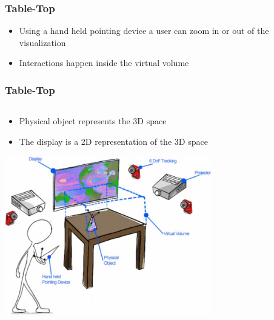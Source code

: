 \documentclass{beamer}
\begin{document}
\begin{frame}
\frametitle{Table-Top} 
	\begin{itemize}
		\item Using a hand held pointing device a user can zoom in or out of the visualization 
		\item Interactions happen inside the virtual volume

	\end{itemize}
\end{frame}

\begin{frame}
\frametitle{Table-Top} 
	\begin{columns}
    \begin{column}{0.9\textwidth}
    \begin{itemize}
		\item Physical object represents the 3D space
		\item The display is a 2D representation of the 3D space
	\end{itemize}
	\begin{center}
	\includegraphics[width=9cm]{../Sample_paper/images/Tabletop}
	\end{center}
	\end{column}
    \end{columns}
\end{frame}
\end{document}
